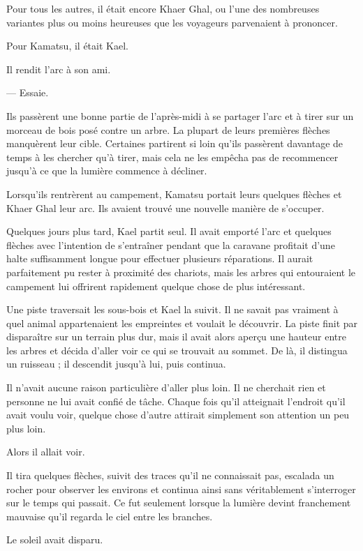 Pour tous les autres, il était encore Khaer Ghal, ou l'une des nombreuses
variantes plus ou moins heureuses que les voyageurs parvenaient à prononcer.

Pour Kamatsu, il était Kael.

Il rendit l'arc à son ami.

— Essaie.

Ils passèrent une bonne partie de l'après-midi à se partager l'arc et à tirer
sur un morceau de bois posé contre un arbre. La plupart de leurs premières
flèches manquèrent leur cible. Certaines partirent si loin qu'ils passèrent
davantage de temps à les chercher qu'à tirer, mais cela ne les empêcha pas de
recommencer jusqu'à ce que la lumière commence à décliner.

Lorsqu'ils rentrèrent au campement, Kamatsu portait leurs quelques flèches et
Khaer Ghal leur arc. Ils avaient trouvé une nouvelle manière de s'occuper.

\scenebreak

Quelques jours plus tard, Kael partit seul. Il avait emporté l'arc et quelques
flèches avec l'intention de s'entraîner pendant que la caravane profitait d'une
halte suffisamment longue pour effectuer plusieurs réparations. Il aurait
parfaitement pu rester à proximité des chariots, mais les arbres qui entouraient
le campement lui offrirent rapidement quelque chose de plus intéressant.

Une piste traversait les sous-bois et Kael la suivit. Il ne savait pas vraiment
à quel animal appartenaient les empreintes et voulait le découvrir. La piste
finit par disparaître sur un terrain plus dur, mais il avait alors aperçu une
hauteur entre les arbres et décida d'aller voir ce qui se trouvait au sommet.
De là, il distingua un ruisseau ; il descendit jusqu'à lui, puis continua.

Il n'avait aucune raison particulière d'aller plus loin. Il ne cherchait rien
et personne ne lui avait confié de tâche. Chaque fois qu'il atteignait l'endroit
qu'il avait voulu voir, quelque chose d'autre attirait simplement son attention
un peu plus loin.

Alors il allait voir.

Il tira quelques flèches, suivit des traces qu'il ne connaissait pas, escalada
un rocher pour observer les environs et continua ainsi sans véritablement
s'interroger sur le temps qui passait. Ce fut seulement lorsque la lumière
devint franchement mauvaise qu'il regarda le ciel entre les branches.

Le soleil avait disparu.

